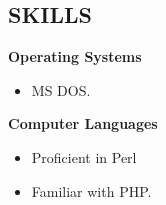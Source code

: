 \documentclass{res}
\begin{document}
\begin{resume}
\section{SKILLS}
\vspace{0.1in}
  {\bf Operating Systems}
    \begin{itemize}
        \item[] MS DOS.
      \end{itemize}

  {\bf Computer Languages}
    \begin{itemize}
        \item[] Proficient in Perl
        \item[] Familiar with PHP.
      \end{itemize}

\end{resume}
\end{document}
